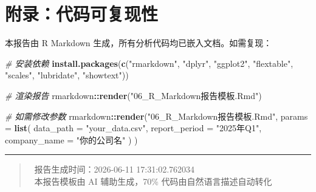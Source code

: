 \documentclass[
]{article}
\newenvironment{Shaded}{\begin{snugshade}}{\end{snugshade}}
\newcommand{\AttributeTok}[1]{\textcolor[rgb]{0.13,0.29,0.53}{#1}}
\newcommand{\CommentTok}[1]{\textcolor[rgb]{0.56,0.35,0.01}{\textit{#1}}}
\newcommand{\FunctionTok}[1]{\textcolor[rgb]{0.13,0.29,0.53}{\textbf{#1}}}
\newcommand{\NormalTok}[1]{#1}
\newcommand{\SpecialCharTok}[1]{\textcolor[rgb]{0.81,0.36,0.00}{\textbf{#1}}}
\newcommand{\StringTok}[1]{\textcolor[rgb]{0.31,0.60,0.02}{#1}}
\begin{document}
\newpage

\section{附录：代码可复现性}\label{ux9644ux5f55ux4ee3ux7801ux53efux590dux73b0ux6027}

本报告由 R Markdown 生成，所有分析代码均已嵌入文档。如需复现：

\begin{Shaded}
\begin{Highlighting}[]
\CommentTok{\# 安装依赖}
\FunctionTok{install.packages}\NormalTok{(}\FunctionTok{c}\NormalTok{(}\StringTok{"rmarkdown"}\NormalTok{, }\StringTok{"dplyr"}\NormalTok{, }\StringTok{"ggplot2"}\NormalTok{, }\StringTok{"flextable"}\NormalTok{, }
                   \StringTok{"scales"}\NormalTok{, }\StringTok{"lubridate"}\NormalTok{, }\StringTok{"showtext"}\NormalTok{))}

\CommentTok{\# 渲染报告}
\NormalTok{rmarkdown}\SpecialCharTok{::}\FunctionTok{render}\NormalTok{(}\StringTok{"06\_R\_Markdown报告模板.Rmd"}\NormalTok{)}

\CommentTok{\# 如需修改参数}
\NormalTok{rmarkdown}\SpecialCharTok{::}\FunctionTok{render}\NormalTok{(}\StringTok{"06\_R\_Markdown报告模板.Rmd"}\NormalTok{,}
  \AttributeTok{params =} \FunctionTok{list}\NormalTok{(}
    \AttributeTok{data\_path    =} \StringTok{"your\_data.csv"}\NormalTok{,}
    \AttributeTok{report\_period =} \StringTok{"2025年Q1"}\NormalTok{,}
    \AttributeTok{company\_name =} \StringTok{"你的公司名"}
\NormalTok{  )}
\NormalTok{)}
\end{Highlighting}
\end{Shaded}

\begin{center}\rule{0.5\linewidth}{0.5pt}\end{center}

\begin{quote}
📧 报告生成时间：2026-06-11 17:31:02.762034\\
🤖 本报告模板由 AI 辅助生成，70\% 代码由自然语言描述自动转化
\end{quote}
\end{document}
